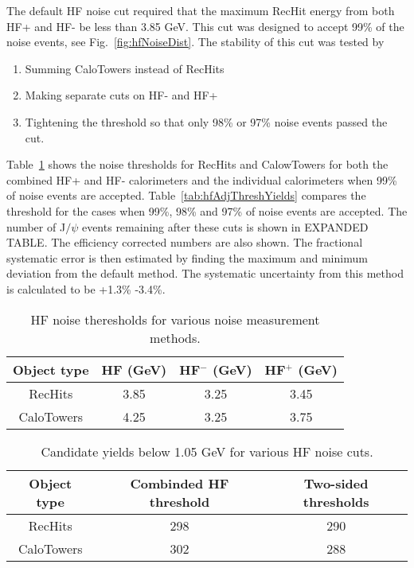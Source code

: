       The default HF noise cut required that the maximum RecHit energy
        from both HF+ and HF- be less than 3.85 GeV. 
      This cut was designed to accept 99\% of the noise events, 
        see Fig.~\ref{fig:hfNoiseDist}. 
      The stability of this cut was tested by
      \begin{enumerate}
        \item Summing CaloTowers instead of RecHits
        \item Making separate cuts on HF- and HF+
        \item Tightening the threshold so that only 98\% or 97\% noise events 
          passed the cut.
      \end{enumerate}

      Table~\ref{tab:hfNoiseThreshAsym} shows the noise thresholds for RecHits 
        and CalowTowers for both the combined HF+ and HF- calorimeters and the 
        individual calorimeters when 99\% of noise events are accepted.
      Table~\ref{tab:hfAdjThreshYields} compares the threshold for the cases 
        when 99\%, 98\% and 97\% of noise events are accepted.
      The number of J$/\psi$ events remaining after these cuts is shown in 
        EXPANDED TABLE. 
      The efficiency corrected numbers are also shown. 
      The fractional systematic error is then estimated by finding the maximum 
        and minimum deviation from the default method. 
      The systematic uncertainty from this method is calculated to be +1.3\% 
        -3.4\%.

      \begin{table}[!Hhbt]
        \centering
        \begin{tabular}{|c|c|c|c|}
          \hline
          Object type & HF (GeV) & HF$^{-}$ (GeV) & HF$^{+}$ (GeV) \\ \hline
          RecHits & 3.85 & 3.25 & 3.45 \\ \hline
          CaloTowers & 4.25 & 3.25 & 3.75 \\ \hline
        \end{tabular}
        \caption{HF noise theresholds for various noise measurement methods.}
        \label{tab:hfNoiseThreshAsym}
      \end{table}

      \begin{table}[!Hhbt]
        \centering
        \begin{tabular}{|c|c|c|}
          \hline
          Object type & Combinded HF threshold & Two-sided thresholds \\ \hline
          RecHits & 298 & 290 \\ \hline
          CaloTowers & 302 & 288 \\ \hline
        \end{tabular}
        \caption{Candidate yields below 1.05 GeV \pt{} for various HF noise
          cuts.}
        \label{tab:hfCutYieldEffects}
      \end{table}

